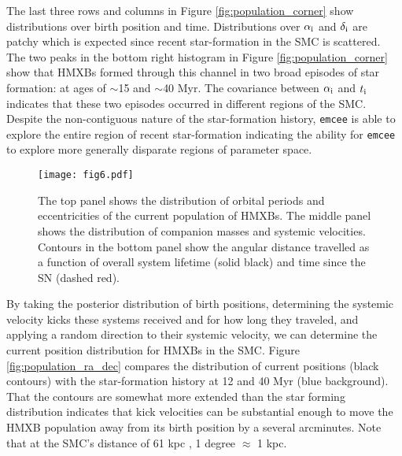 \documentclass[usenatbib]{mnras}
\begin{document}
The last three rows and columns in Figure \ref{fig:population_corner} show distributions over birth position and time. Distributions over $\alpha_{\rm i}$ and $\delta_{\rm i}$ are patchy which is expected since recent star-formation in the SMC is scattered. The two peaks in the bottom right histogram in Figure \ref{fig:population_corner} show that HMXBs formed through this channel in two broad episodes of star formation: at ages of $\sim$15 and $\sim$40 Myr. The covariance between $\alpha_{\rm i}$ and $t_{\rm i}$ indicates that these two episodes occurred in different regions of the SMC. Despite the non-contiguous nature of the star-formation history, {\tt emcee} is able to explore the entire region of recent star-formation indicating the ability for {\tt emcee} to explore more generally disparate regions of parameter space.  


\begin{figure}
\begin{center}
\texttt{[image: fig6.pdf]}
\caption{ The top panel shows the distribution of orbital periods and eccentricities of the current population of HMXBs. The middle panel shows the distribution of companion masses and systemic velocities. Contours in the bottom panel show the angular distance travelled as a function of  overall system lifetime (solid black) and time since the SN (dashed red). }
\label{fig:smc_population_HMXB}
\end{center}
\end{figure}


By taking the posterior distribution of birth positions, determining the systemic velocity kicks these systems received and for how long they traveled, and applying a random direction to their systemic velocity, we can determine the current position distribution for HMXBs in the SMC. Figure \ref{fig:population_ra_dec} compares the distribution of current positions (black contours) with the star-formation history at 12 and 40 Myr (blue background). That the contours are somewhat more extended than the star forming distribution indicates that kick velocities can be substantial enough to move the HMXB population away from its birth position by a several arcminutes. Note that at the SMC's distance of 61 kpc \citep{hilditch05}, 1 degree $\approx$ 1 kpc.
\end{document}
